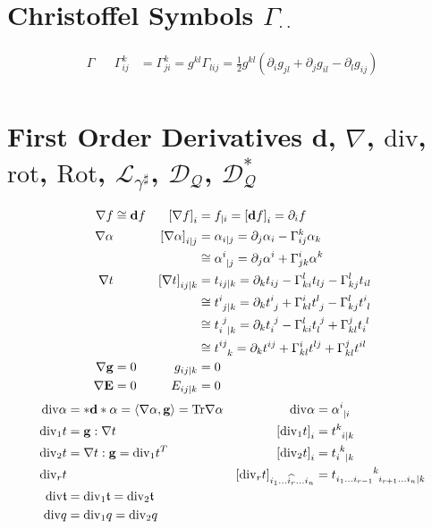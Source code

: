 \documentclass[a4paper,7pt]{scrartcl}
\newcommand{\exd}{\mathbf{d}}
\newcommand{\Tr}{\mathrm{Tr}}
\newcommand{\rot}{\mathrm{rot}}
\renewcommand{\div}{\mathrm{div}}
\newcommand{\Rot}{\mathrm{Rot}}
\newcommand{\lie}{\mathcal{L}}
\newcommand{\dq}{\mathcal{D}_{\mathcal{Q}}}
\newcommand{\gb}{\mathbf{g}}
\newcommand{\Eb}{\mathbf{E}}
\newcommand{\tsym}{\mathfrak{t}}
\begin{document}
\section{Christoffel Symbols \( \Gamma^{\cdot}_{\cdot\cdot} \)}
\begin{align*}
  \Gamma &&\Gamma^{k}_{ij} &= \Gamma^{k}_{ji} = g^{kl}\Gamma_{lij} = \frac{1}{2}g^{kl}\left( \partial_{i}g_{jl} + \partial_{j}g_{il} - \partial_{l}g_{ij} \right) \\
\end{align*}

\section{First Order Derivatives \( \exd \), \( \nabla \), \( \div \), \( \rot \), \( \Rot \), \( \lie_{\gamma^{\sharp}} \), \( \dq \), \( \dq^{*} \)}
\begin{align*}
  \nabla f &\cong \exd f 
          & \left[ \nabla f \right]_{i} &= f_{|i} = \left[ \exd f \right]_{i} = \partial_{i}f \\
  \nabla \alpha &
          & \left[ \nabla \alpha \right]_{i|j} &= \alpha_{i|j} = \partial_{j}\alpha_{i} - \Gamma^{k}_{ij}\alpha_{k} \\
          &&&\cong \tensor{\alpha}{^{i}_{|j}} = \partial_{j}\alpha^{i} + \Gamma^{i}_{jk}\alpha^{k}\\
  \nabla t &
          & \left[ \nabla t \right]_{ij|k} &= t_{ij|k} = \partial_{k}t_{ij} - \Gamma^{l}_{ki}t_{lj} - \Gamma^{l}_{kj}t_{il} \\
                       &&&\cong \tensor{t}{^{i}_{j|k}} = \partial_{k}\tensor{t}{^{i}_{j}} + \Gamma^{i}_{kl}\tensor{t}{^{l}_{j}} - \Gamma^{l}_{kj}\tensor{t}{^{i}_{l}}\\
                    &&&\cong \tensor{t}{_{i}^{j}_{|k}} = \partial_{k}\tensor{t}{_{i}^{j}} - \Gamma^{l}_{ki}\tensor{t}{_{l}^{j}} + \Gamma^{j}_{kl}\tensor{t}{_{i}^{l}}\\
                       &&&\cong\tensor{t}{^{ij}_{k}}   = \partial_{k}t^{ij} + \Gamma^{i}_{kl}t^{lj} + \Gamma^{j}_{kl}t^{il}\\
  \nabla \gb &= 0 & g_{ij|k} &= 0\\
  \nabla \Eb &= 0 & E_{ij|k} &= 0
\end{align*}
\begin{align*}
  \div\alpha &= *\exd * \alpha = \left\langle \nabla\alpha, \gb \right\rangle = \Tr\nabla\alpha
          &\div\alpha &= \tensor{\alpha}{^{i}_{|i}} \\
  \div_{1}t &= \gb:\nabla t
          & \left[ \div_{1}t \right]_{i} &= \tensor{t}{^{k}_{i|k}}\\
  \div_{2}t &= \nabla t :\gb = \div_{1}t^{T}
          & \left[ \div_{2}t \right]_{i} &= \tensor{t}{_{i}^{k}_{|k}}\\
  \div_{r}t &
          & \left[ \div_{r}t \right]_{i_{1}\ldots \widehat{i_{r}} \ldots i_{n}} &=\tensor{t}{_{i_{1}\ldots i_{r-1}}^{k}_{i_{r+1}\ldots i_{n}|k}} \\
  \div \tsym &= \div_{1}\tsym = \div_{2}\tsym\\
  \div q &= \div_{1}q = \div_{2}q
\end{align*}
\end{document}
